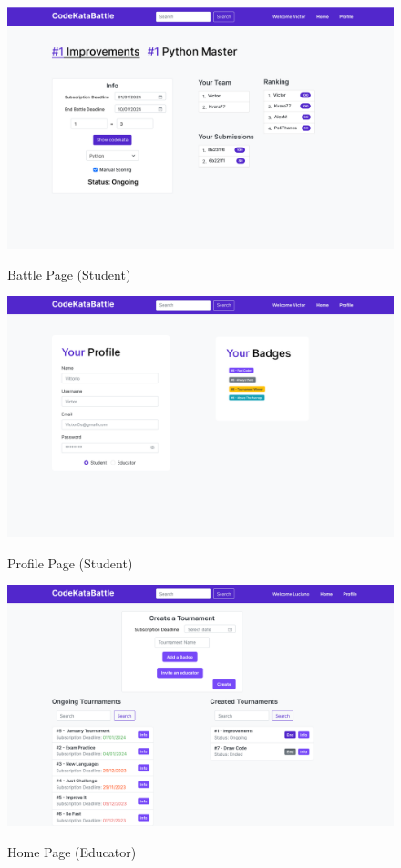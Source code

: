 \documentclass{Configuration_Files/Template}
\begin{document}
\begin{figure}[H]
\centering
\includegraphics[scale = 0.25]{Images/UI/BattlePage_Student.png}\\
\caption{Battle Page (Student)}
\end{figure}

\begin{figure}[H]
\centering
\includegraphics[scale = 0.25]{Images/UI/Profile_Student.png}\\
\caption{Profile Page (Student) }
\end{figure}

\begin{figure}[H]
\centering
\includegraphics[scale = 0.25]{Images/UI/MainPageEducator.png}\\
\caption{Home Page (Educator)}
\end{figure}
\end{document}
